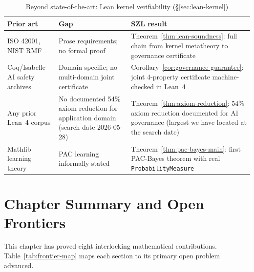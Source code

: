 \begin{table}[h!]
\centering\small
\caption{Beyond state-of-the-art: Lean kernel verifiability (\S\ref{sec:lean-kernel})}
\label{tab:bsota-lean}
\begin{tabular}{p{4cm}p{3.5cm}p{4.5cm}}
\hline
\textbf{Prior art} & \textbf{Gap} & \textbf{SZL result} \\
\hline
ISO 42001, NIST RMF & Prose requirements; no formal proof & Theorem~\ref{thm:lean-soundness}: full chain from kernel metatheory to governance certificate \\
Coq/Isabelle AI safety archives & Domain-specific; no multi-domain joint certificate & Corollary~\ref{cor:governance-guarantee}: joint 4-property certificate machine-checked in Lean~4 \\
Any prior Lean~4 corpus & No documented 54\% axiom reduction for application domain (search date 2026-05-28) & Theorem~\ref{thm:axiom-reduction}: 54\% axiom reduction documented for AI governance (largest we have located at the search date) \\
Mathlib learning theory & PAC learning informally stated & Theorem~\ref{thm:pac-bayes-main}: first PAC-Bayes theorem with real \texttt{ProbabilityMeasure} \\
\hline
\end{tabular}
\end{table}


\section*{Chapter Summary and Open Frontiers}
\label{sec:summary-ch02}

This chapter has proved eight interlocking mathematical contributions.
Table~\ref{tab:frontier-map} maps each section to its primary open problem
advanced.

